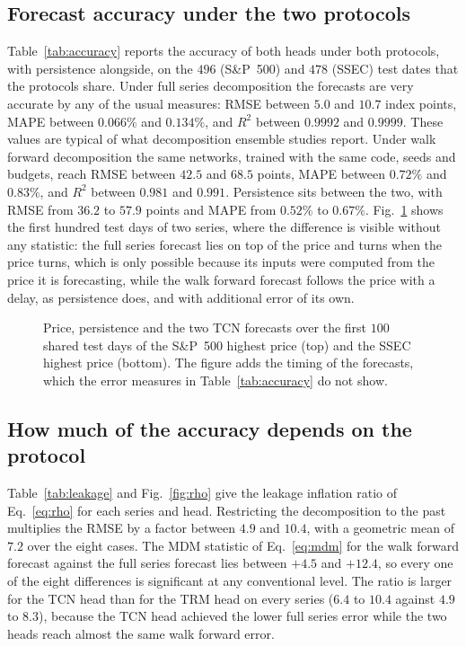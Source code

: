 \subsection{Forecast accuracy under the two protocols}
Table~\ref{tab:accuracy} reports the accuracy of both heads under both
protocols, with persistence alongside, on the $496$ (S\&P~500) and $478$
(SSEC) test dates that the protocols share. Under full series decomposition
the forecasts are very accurate by any of the usual measures: RMSE between
$5.0$ and $10.7$ index points, MAPE between $0.066\%$ and $0.134\%$, and $R^2$
between $0.9992$ and $0.9999$. These values are typical of what decomposition
ensemble studies report. Under walk forward decomposition the same networks,
trained with the same code, seeds and budgets, reach RMSE between $42.5$ and
$68.5$ points, MAPE between $0.72\%$ and $0.83\%$, and $R^2$ between $0.981$
and $0.991$. Persistence sits between the two, with RMSE from $36.2$ to $57.9$
points and MAPE from $0.52\%$ to $0.67\%$. Fig.~\ref{fig:trace} shows the
first hundred test days of two series, where the difference is visible without
any statistic: the full series forecast lies on top of the price and turns
when the price turns, which is only possible because its inputs were computed
from the price it is forecasting, while the walk forward forecast follows the
price with a delay, as persistence does, and with additional error of its own.


\begin{figure}[ht]
\centering
{}
\caption{Price, persistence and the two TCN forecasts over the first $100$
shared test days of the S\&P~500 highest price (top) and the SSEC highest price
(bottom). The figure adds the timing of the forecasts, which the error
measures in Table~\ref{tab:accuracy} do not show.}
\label{fig:trace}
\end{figure}

\subsection{How much of the accuracy depends on the protocol}
Table~\ref{tab:leakage} and Fig.~\ref{fig:rho} give the leakage inflation
ratio of Eq.~\eqref{eq:rho} for each series and head. Restricting the
decomposition to the past multiplies the RMSE by a factor between $4.9$ and
$10.4$, with a geometric mean of $7.2$ over the eight cases. The MDM statistic
of Eq.~\eqref{eq:mdm} for the walk forward forecast against the full series
forecast lies between $+4.5$ and $+12.4$, so every one of the eight
differences is significant at any conventional level. The ratio is larger for
the TCN head than for the TRM head on every series ($6.4$ to $10.4$ against
$4.9$ to $8.3$), because the TCN head achieved the lower full series error
while the two heads reach almost the same walk forward error.

